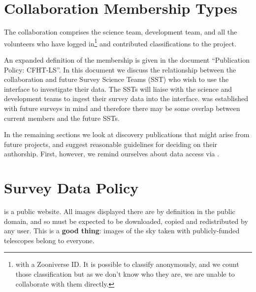 \documentclass[a4paper]{article}
\begin{document}


\section{Collaboration Membership Types}
\label{sec:members}

The \sw collaboration comprises the \sw science team, \sw development team, and all the volunteers who have 
logged in\footnote{with a Zooniverse ID. It is possible to classify anonymously, and we count those classification but as we don't know who they are, we are unable to collaborate with them directly.} and contributed classifications to the project. 

An expanded definition of the \sw membership is given in the document ``\sw Publication Policy: CFHT-LS''.  In this document we discuss the relationship between the \sw collaboration and future Survey Science Teams (SST) who wish to use the \sw interface to investigate their data. The SSTs will liaise with the \sw science and development teams to ingest their survey data into the \sw interface. \sw was established with future surveys in mind and therefore there may be some overlap between current \sw members and the future SSTs.


In the remaining sections we look at discovery publications that might
arise from future \sw projects, and suggest reasonable guidelines for
deciding on their authorship. First, however, we remind ourselves about data
access via \sw.



\section{Survey Data Policy}
\label{sec:data}

\sw is a public website. All images displayed there are by definition in the
public domain, and so must be expected to be downloaded, copied and
redistributed by any \sw user. This is a \textbf{good thing}: images of the sky taken
with publicly-funded telescopes belong to everyone. 
\end{document}
